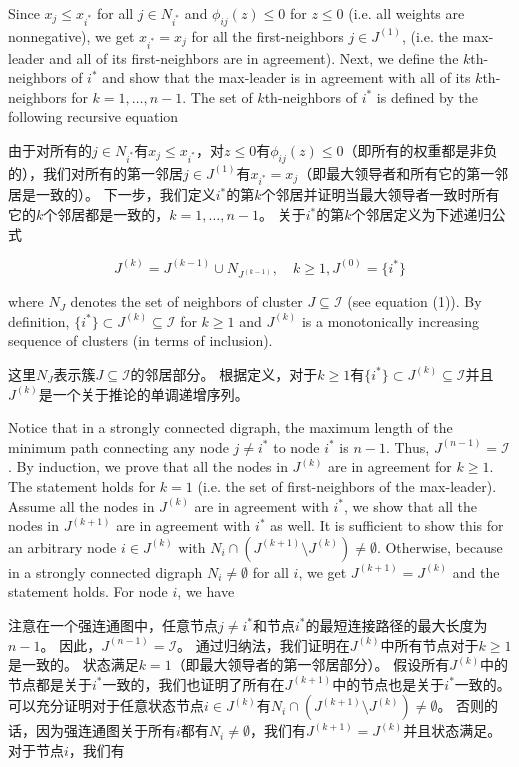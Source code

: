 \documentclass{article}
\begin{document}
{\color[gray]{0.5}
\noindent Since $x_j\le x_{i^*}$ for all $j\in N_{i^*}$ and $\phi_{ij}(z)\le 0$ for $z\le 0$ (i.e. all weights are nonnegative), we get $x_{i^*}=x_j$ for all the ﬁrst-neighbors $j\in J^{(1)}$, (i.e. the max-leader and all of its ﬁrst-neighbors are in agreement). 
Next, we deﬁne the $k$th-neighbors of $i^*$ and show that the max-leader is in agreement with all of its $k$th-neighbors for $k = 1,\dots, n − 1$. 
The set of $k$th-neighbors of $i^*$ is defined by the following recursive equation
}

\noindent 由于对所有的$j\in N_{i^*}$有$x_j\le x_{i^*}$，对$z\le 0$有$\phi_{ij}(z)\le 0$（即所有的权重都是非负的），我们对所有的第一邻居$j\in J^{(1)}$有$x_{i^*}=x_j$（即最大领导者和所有它的第一邻居是一致的）。
下一步，我们定义$i^*$的第$k$个邻居并证明当最大领导者一致时所有它的$k$个邻居都是一致的，$k = 1,\dots, n − 1$。
关于$i^*$的第$k$个邻居定义为下述递归公式

\begin{equation}
    \tag{46}
    \label{46}
    J^{(k)} = J^{(k-1)} \cup N_{J^{(k-1)}},\quad k\ge 1, J^{(0)}=\{i^*\}
\end{equation}

{\color[gray]{0.5}
\noindent where $N_J$ denotes the set of neighbors of cluster $J\subseteq\mathcal{I}$ (see equation (1)). 
By definition, $\{i^*\}\subset J^{(k)} \subseteq \mathcal{I}$ for $k\ge1$ and $J^{(k)}$ is a monotonically increasing sequence of clusters (in terms of inclusion). 
}

\noindent 这里$N_J$表示簇$J\subseteq\mathcal{I}$的邻居部分。
根据定义，对于$k\ge1$有$\{i^*\}\subset J^{(k)} \subseteq \mathcal{I}$并且$J^{(k)}$是一个关于推论的单调递增序列。

{\color[gray]{0.5}
Notice that in a strongly connected digraph, the maximum length of the minimum path connecting any node $j\ne i^*$ to node $i^*$ is $n-1$. 
Thus, $J^{(n-1)} = \mathcal{I}$. 
By induction, we prove that all the nodes in $J^{(k)}$ are in agreement for $k\ge 1$. 
The statement holds for $k=1$ (i.e. the set of first-neighbors of the max-leader). 
Assume all the nodes in $J^{(k)}$ are in agreement with $i^*$, we show that all the nodes in $J^{(k+1)}$ are in agreement with $i^*$ as well. 
It is sufficient to show this for an arbitrary node $i\in J^{(k)}$ with $N_i \cap (J^{(k+1)}\setminus J^{(k)}) \ne \emptyset$. 
Otherwise, because in a strongly connected digraph $N_i \ne \emptyset$ for all $i$, we get $J^{(k+1)}=J^{(k)}$ and the statement holds. 
For node $i$, we have
}

注意在一个强连通图中，任意节点$j\ne i^*$和节点$i^*$的最短连接路径的最大长度为$n-1$。
因此，$J^{(n-1)} = \mathcal{I}$。
通过归纳法，我们证明在$J^{(k)}$中所有节点对于$k\ge 1$是一致的。
状态满足$k=1$（即最大领导者的第一邻居部分）。
假设所有$J^{(k)}$中的节点都是关于$i^*$一致的，我们也证明了所有在$J^{(k+1)}$中的节点也是关于$i^*$一致的。
可以充分证明对于任意状态节点$i\in J^{(k)}$有$N_i \cap (J^{(k+1)}\setminus J^{(k)}) \ne \emptyset$。
否则的话，因为强连通图关于所有$i$都有$N_i \ne \emptyset$，我们有$J^{(k+1)}=J^{(k)}$并且状态满足。
对于节点$i$，我们有
\end{document}
